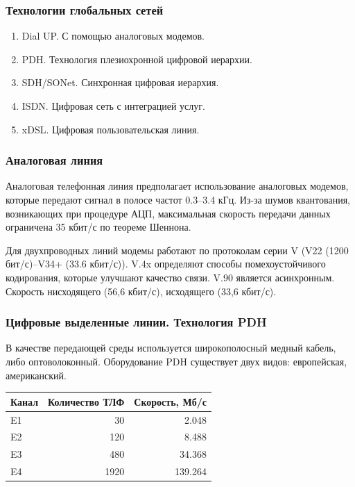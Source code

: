 \documentclass[12pt, russian, oneside, article]{ncc}
\begin{document}
\subsubsection{Технологии глобальных сетей}
\label{sec-5_2_5}


\begin{enumerate}
\item Dial UP. С помощью аналоговых модемов.
\item PDH. Технология плезиохронной цифровой иерархии.
\item SDH/SONet. Синхронная цифровая иерархия.
\item ISDN. Цифровая сеть с интеграцией услуг.
\item xDSL. Цифровая пользовательская линия.
\end{enumerate}
\subsubsection{Аналоговая линия}
\label{sec-5_2_6}


Аналоговая телефонная линия предполагает использование аналоговых модемов, которые передают сигнал в полосе частот 0.3--3.4 кГц. Из-за шумов квантования, возникающих при процедуре АЦП, максимальная скорость передачи данных ограничена 35 кбит/с по теореме Шеннона.

Для двухпроводных линий модемы работают по протоколам серии V (V22 (1200 бит/с)--V34+ (33.6 кбит/с)). V.4x определяют способы помехоустойчивого кодирования, которые улучшают качество связи. V.90 является асинхронным. Скорость нисходящего (56,6 кбит/с), исходящего (33,6 кбит/с).
\subsubsection{Цифровые выделенные линии. Технология PDH}
\label{sec-5_2_7}


В качестве передающей среды используется широкополосный медный кабель, либо оптоволоконный. Оборудование PDH существует двух видов: европейская, американский.


\begin{center}
\begin{tabular}{lrr}
 Канал  &  Количество ТЛФ  &  Скорость, Мб/с  \\
\hline
 E1     &              30  &           2.048  \\
 E2     &             120  &           8.488  \\
 E3     &             480  &          34.368  \\
 E4     &            1920  &         139.264  \\
\end{tabular}
\end{center}
\end{document}
